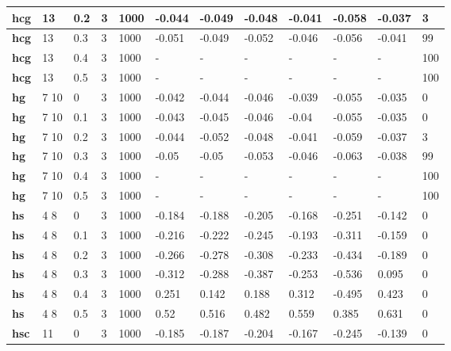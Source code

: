 \begin{longtable}[h]{|p{0.8cm}|p{1.5cm}|p{1cm}|p{1cm}|p{1cm}|p{1cm}|p{1cm}|p{1cm}|p{1cm}|p{1cm}|p{1cm}|p{1.5cm}|}
    \\ \hline
  \textbf{hcg } &  13         & 0.2 & 3 & 1000 & -0.044 & -0.049 & -0.048 & -0.041 & -0.058 & -0.037 &   3
    \\ \hline
  \textbf{hcg } &  13         & 0.3 & 3 & 1000 & -0.051 & -0.049 & -0.052 & -0.046 & -0.056 & -0.041 &  99
    \\ \hline
  \textbf{hcg } &  13         & 0.4 & 3 & 1000 & - & - & - & - & - & - & 100
    \\ \hline
  \textbf{hcg } &  13         & 0.5 & 3 & 1000 & - & - & - & - & - & - & 100
    \\ \hline
  \textbf{hg  } &  7 10       &   0 & 3 & 1000 & -0.042 & -0.044 & -0.046 & -0.039 & -0.055 & -0.035 &   0
    \\ \hline
  \textbf{hg  } &  7 10       & 0.1 & 3 & 1000 & -0.043 & -0.045 & -0.046 &  -0.04 & -0.055 & -0.035 &   0
    \\ \hline
  \textbf{hg  } &  7 10       & 0.2 & 3 & 1000 & -0.044 & -0.052 & -0.048 & -0.041 & -0.059 & -0.037 &   3
    \\ \hline
  \textbf{hg  } &  7 10       & 0.3 & 3 & 1000 &  -0.05 &  -0.05 & -0.053 & -0.046 & -0.063 & -0.038 &  99
    \\ \hline
  \textbf{hg  } &  7 10       & 0.4 & 3 & 1000 & - & - & - & - & - & - & 100
    \\ \hline
  \textbf{hg  } &  7 10       & 0.5 & 3 & 1000 & - & - & - & - & - & - & 100
    \\ \hline
  \textbf{hs  } &  4 8        &   0 & 3 & 1000 & -0.184 & -0.188 & -0.205 & -0.168 & -0.251 & -0.142 &   0
    \\ \hline
  \textbf{hs  } &  4 8        & 0.1 & 3 & 1000 & -0.216 & -0.222 & -0.245 & -0.193 & -0.311 & -0.159 &   0
    \\ \hline
  \textbf{hs  } &  4 8        & 0.2 & 3 & 1000 & -0.266 & -0.278 & -0.308 & -0.233 & -0.434 & -0.189 &   0
    \\ \hline
  \textbf{hs  } &  4 8        & 0.3 & 3 & 1000 & -0.312 & -0.288 & -0.387 & -0.253 & -0.536 &  0.095 &   0
    \\ \hline
  \textbf{hs  } &  4 8        & 0.4 & 3 & 1000 &  0.251 &  0.142 &  0.188 &  0.312 & -0.495 &  0.423 &   0
    \\ \hline
  \textbf{hs  } &  4 8        & 0.5 & 3 & 1000 &   0.52 &  0.516 &  0.482 &  0.559 &  0.385 &  0.631 &   0
    \\ \hline
  \textbf{hsc } &  11         &   0 & 3 & 1000 & -0.185 & -0.187 & -0.204 & -0.167 & -0.245 & -0.139 &   0

\end{longtable}
